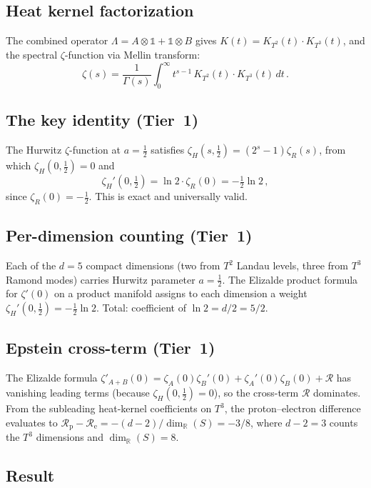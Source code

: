 \documentclass[11pt,a4paper]{article}
\begin{document}
\subsection{Heat kernel factorization}

The combined operator $\Lambda=A\otimes\mathbb{1}+\mathbb{1}\otimes B$
gives $K(t)=K_{T^2}(t)\cdot K_{T^3}(t)$, and the spectral
$\zeta$-function via Mellin transform:
\[
  \zeta(s) = \frac{1}{\Gamma(s)}\int_0^\infty t^{s-1}\,
  K_{T^2}(t)\cdot K_{T^3}(t)\,dt\,.
\]

\subsection{The key identity (Tier~1)}

The Hurwitz $\zeta$-function at $a=\tfrac12$ satisfies
$\zeta_H(s,\tfrac12) = (2^s-1)\zeta_R(s)$, from which
$\zeta_H(0,\tfrac12)=0$ and
\begin{equation}\label{eq:hurwitz}
  \zeta_H'(0,\tfrac12) = \ln 2\cdot\zeta_R(0) = -\tfrac12\ln 2\,,
\end{equation}
since $\zeta_R(0)=-\tfrac12$.  This is exact and universally valid.

\subsection{Per-dimension counting (Tier~1)}

Each of the $d=5$ compact dimensions (two from $T^2$ Landau levels,
three from $T^3$ Ramond modes) carries Hurwitz parameter $a=\tfrac12$.
The Elizalde product formula for $\zeta'(0)$ on a product manifold
assigns to each dimension a weight $\zeta_H'(0,\tfrac12)=-\tfrac12\ln 2$.
Total: coefficient of $\ln 2 = d/2 = 5/2$.

\subsection{Epstein cross-term (Tier~1)}

The Elizalde formula $\zeta'_{A+B}(0)=\zeta_A(0)\zeta_B'(0)+
\zeta_A'(0)\zeta_B(0)+\mathcal{R}$ has vanishing leading terms (because
$\zeta_H(0,\tfrac12)=0$), so the cross-term $\mathcal{R}$ dominates.
From the subleading heat-kernel coefficients on $T^3$, the
proton--electron difference evaluates to
$\mathcal{R}_{\mathrm{p}}-\mathcal{R}_{\mathrm{e}}
=-(d{-}2)/\dim_\mathbb{R}(S)=-3/8$, where $d{-}2=3$ counts the
$T^3$ dimensions and $\dim_\mathbb{R}(S)=8$.

\subsection{Result}
\end{document}
